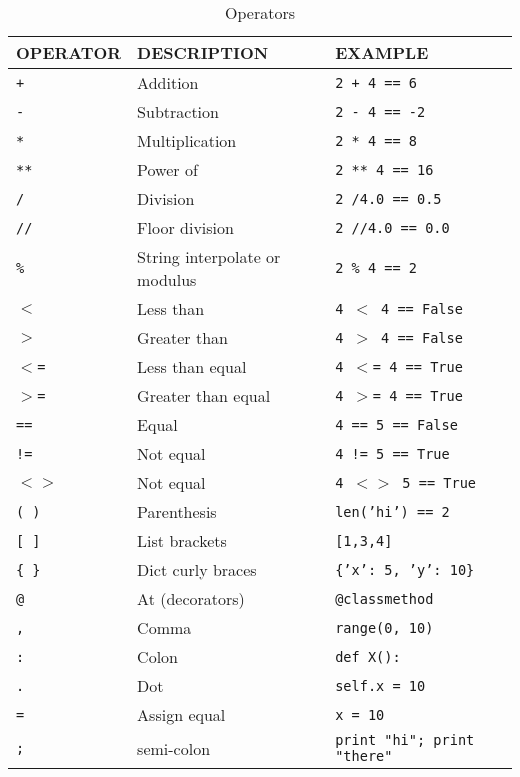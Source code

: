     \begin{table}[htbp]
      \begin{minipage}{\linewidth}
      \setlength{\tymax}{0.5\linewidth}
      \centering
      \small
    \caption{Operators}
    \label{operators}
      \begin{tabulary}{\textwidth}{@{}LLL@{}} \toprule
    OPERATOR&DESCRIPTION&EXAMPLE\\
      \midrule
    \texttt{+}&Addition&\texttt{2 + 4 == 6}\\
    \texttt{-}&Subtraction&\texttt{2 - 4 == -2}\\
    \texttt{*}&Multiplication&\texttt{2 * 4 == 8}\\
    \texttt{**}&Power of&\texttt{2 ** 4 == 16}\\
    \texttt{\slash }&Division&\texttt{2 \slash  4.0 == 0.5}\\
    \texttt{/\slash }&Floor division&\texttt{2 /\slash  4.0 == 0.0}\\
    \texttt{\%}&String interpolate or modulus&\texttt{2 \% 4 == 2}\\
    \texttt{$<$}&Less than&\texttt{4 $<$ 4 == False}\\
    \texttt{$>$}&Greater than&\texttt{4 $>$ 4 == False}\\
    \texttt{$<$=}&Less than equal&\texttt{4 $<$= 4 == True}\\
    \texttt{$>$=}&Greater than equal&\texttt{4 $>$= 4 == True}\\
    \texttt{==}&Equal&\texttt{4 == 5 == False}\\
    \texttt{!=}&Not equal&\texttt{4 != 5 == True}\\
    \texttt{$<$$>$}&Not equal&\texttt{4 $<$$>$ 5 == True}\\
    \texttt{( )}&Parenthesis&\texttt{len('hi') == 2}\\
    \texttt{[ ]}&List brackets&\texttt{[1,3,4]}\\
    \texttt{\{ \}}&Dict curly braces&\texttt{\{'x': 5, 'y': 10\}}\\
    \texttt{@}&At (decorators)&\texttt{@classmethod}\\
    \texttt{,}&Comma&\texttt{range(0, 10)}\\
    \texttt{:}&Colon&\texttt{def X():}\\
    \texttt{.}&Dot&\texttt{self.x = 10}\\
    \texttt{=}&Assign equal&\texttt{x = 10}\\
    \texttt{;}&semi-colon&\texttt{print "hi"; print "there"}\\

\end{tabulary}
\end{minipage}
\end{table}
